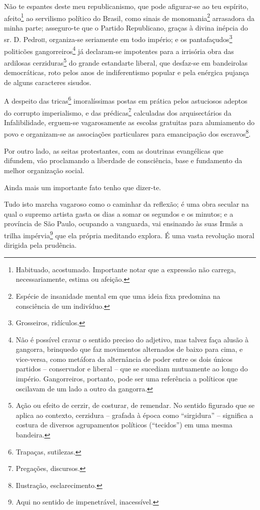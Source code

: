 Não te espantes deste meu republicanismo, que pode afigurar-se ao teu
espírito, afeito\footnote{ Habituado, acostumado. Importante notar que
  a expressão não carrega, necessariamente, estima ou afeição.} ao
servilismo político do Brasil, como sinais de {monomania}\footnote{
  Espécie de insanidade mental em que uma ideia fixa predomina na
  consciência de um indivíduo.} {arrasadora} da minha parte; asseguro-te
que o Partido Republicano, graças à divina inépcia do sr. D. Pedro\textsc{ii},
organiza-se seriamente em todo império; e os pantafaçudos\footnote{
  Grosseiros, ridículos.} politicões gangorreiros\footnote{ Não é
  possível cravar o sentido preciso do adjetivo, mas talvez faça alusão
  à gangorra, brinquedo que faz movimentos alternados de baixo para
  cima, e vice-versa, como metáfora da alternância de poder entre os
  dois únicos partidos -- conservador e liberal -- que se sucediam
  mutuamente ao longo do império. Gangorreiros, portanto, pode ser uma
  referência a políticos que oscilavam de um lado a outro da gangorra.}
já declaram-se impotentes para a irrisória obra das ardilosas
cerziduras\footnote{ Ação ou efeito de cerzir, de costurar, de
  remendar. No sentido figurado que se aplica ao contexto, cerzidura --
  grafada à época como ``sirgidura'' -- significa a costura de diversos
  agrupamentos políticos (``tecidos'') em uma mesma bandeira.} do g{rande
estandarte liberal}, que desfaz-se em bandeirolas democráticas, roto
pelos anos de indiferentismo popular e pela enérgica pujança de alguns
caracteres sisudos.

A despeito das tricas\footnote{ Trapaças, sutilezas.} imoralíssimas
postas em prática pelos astuciosos adeptos do corrupto imperialismo, e
das prédicas\footnote{ Pregações, discursos.} calculadas dos
arquisectários da {Infalibilidade}, erguem-se vagarosamente as escolas
gratuitas para alumiamento do povo e organizam-se as associações
particulares para emancipação dos escravos\footnote{ Ilustração,
  esclarecimento.}.

Por outro lado, as seitas protestantes, com as doutrinas evangélicas que
difundem, vão proclamando a liberdade de consciência, base e fundamento
da melhor organização social.

Ainda mais um importante fato tenho que dizer-te.

Tudo isto marcha vagaroso como o caminhar da reflexão; é uma obra
secular na qual o {supremo artista} gasta os dias a somar os segundos e
os minutos; e a província de São Paulo, ocupando a vanguarda, vai
ensinando às suas Irmãs a trilha impérvia\footnote{ Aqui no sentido de
  impenetrável, inacessível.} que ela própria meditando explora. É uma
vasta revolução moral dirigida pela prudência.

